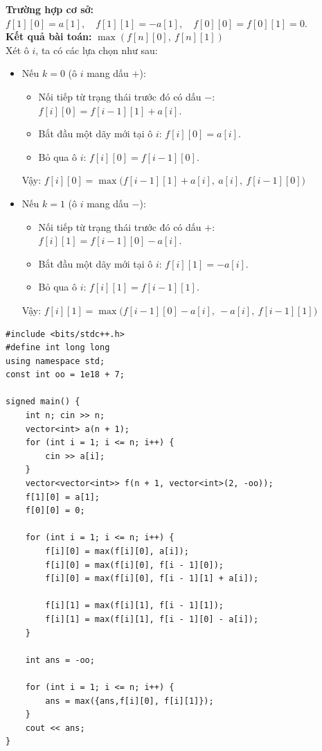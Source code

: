 \textbf{Trường hợp cơ sở:} $f[1][0] = a[1], \quad f[1][1] = -a[1], \quad f[0][0] = f[0][1] = 0$.\\

\textbf{Kết quả bài toán:}  $\max(f[n][0],\ f[n][1])$\\

Xét ô $i$, ta có các lựa chọn như sau:

\begin{itemize}
    \item Nếu $k = 0$ (ô $i$ mang dấu $+$):
    \begin{itemize}
        \item Nối tiếp từ trạng thái trước đó có dấu $-$: $f[i][0] = f[i-1][1] + a[i]$.
        \item Bắt đầu một dãy mới tại ô $i$: $f[i][0] = a[i]$.
        \item Bỏ qua ô $i$: $f[i][0] = f[i-1][0]$.
    \end{itemize}
    Vậy: $f[i][0] = \max \big( f[i-1][1] + a[i],\ a[i],\ f[i-1][0] \big)$

    \item Nếu $k = 1$ (ô $i$ mang dấu $-$):
    \begin{itemize}
        \item Nối tiếp từ trạng thái trước đó có dấu $+$: $f[i][1] = f[i-1][0] - a[i]$.
        \item Bắt đầu một dãy mới tại ô $i$: $f[i][1] = -a[i]$.
        \item Bỏ qua ô $i$: $f[i][1] = f[i-1][1]$.
    \end{itemize}
    Vậy: $f[i][1] = \max \big( f[i-1][0] - a[i],\ -a[i],\ f[i-1][1] \big)$
\end{itemize}


\begin{lstlisting}[title=\centering\textbf{Cài đặt}]
#include <bits/stdc++.h>
#define int long long
using namespace std;
const int oo = 1e18 + 7;

signed main() {
    int n; cin >> n;
    vector<int> a(n + 1);
    for (int i = 1; i <= n; i++) {
        cin >> a[i];
    }
    vector<vector<int>> f(n + 1, vector<int>(2, -oo));
    f[1][0] = a[1];
    f[0][0] = 0;

    for (int i = 1; i <= n; i++) {
        f[i][0] = max(f[i][0], a[i]);
        f[i][0] = max(f[i][0], f[i - 1][0]);
        f[i][0] = max(f[i][0], f[i - 1][1] + a[i]);
        
        f[i][1] = max(f[i][1], f[i - 1][1]);
        f[i][1] = max(f[i][1], f[i - 1][0] - a[i]);
    }

    int ans = -oo;

    for (int i = 1; i <= n; i++) {
        ans = max({ans,f[i][0], f[i][1]});
    }
    cout << ans;
}
\end{lstlisting}


